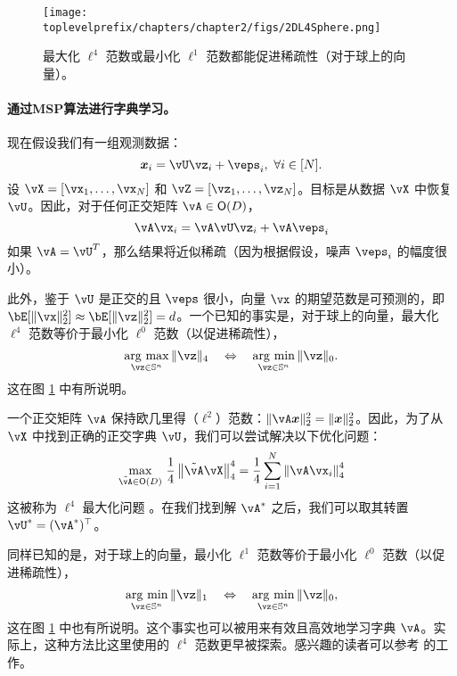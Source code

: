 \documentclass[../../book-main.tex]{subfiles}
\begin{document}
\begin{figure}
    \centering
    \texttt{[image: \\toplevelprefix/chapters/chapter2/figs/2DL4Sphere.png]}\vspace{-0.1in}
    \caption{最大化 $\ell^4$ 范数或最小化 $\ell^1$ 范数都能促进稀疏性（对于球上的向量）。}
    \label{fig:L4-sphere}
\end{figure}


\paragraph{通过MSP算法进行字典学习。}

现在假设我们有一组观测数据：
\begin{equation}
    \x_i = \vU \vz_i + \veps_i,\ \forall i \in [N].
\end{equation}
设 $\vX = [\vx_1, \dots, \vx_N]$ 和 $\vZ = [\vz_1, \dots, \vz_N]$。目标是从数据 $\vX$ 中恢复 $\vU$。因此，对于任何正交矩阵 $\vA \in \O(D)$，
\begin{equation}
    \vA\vx_i = \vA\vU \vz_i + \vA\veps_i
\end{equation}
如果 $\vA = \vU^T$，那么结果将近似稀疏（因为根据假设，噪声 $\veps_i$ 的幅度很小）。

此外，鉴于 $\vU$ 是正交的且 $\veps$ 很小，向量 $\vx$ 的期望范数是可预测的，即 $\bE[\norm{\vx}_2^2] \approx \bE[\norm{\vz}_2^2]=d$。一个已知的事实是，对于球上的向量，最大化 $\ell^4$ 范数等价于最小化 $\ell^0$ 范数（以促进稀疏性），
\begin{equation}
    \argmax_{\vz \in \mathbb{S}^n}\|\vz\|_{4}\quad\Leftrightarrow\quad \argmin_{\vz \in \mathbb{S}^n}\|\vz\|_{0}.
\end{equation}
这在图 \ref{fig:L4-sphere} 中有所说明。

一个正交矩阵 $\vA$ 保持欧几里得（\(\ell^{2}\)）范数：$\|\vA \x\|_2^2 = \|\x\|_2^2$。因此，为了从 $\vX$ 中找到正确的正交字典 $\vU$，我们可以尝试解决以下优化问题：
\begin{equation}\label{eq0:orthogonal-dictionary-learning-l4}
    \max_{\tilde{\vA} \in \O(D)}\,
     \frac{1}{4} \norm*{
    \tilde{\vA} \vX
    }_4^4 =  \frac{1}{4} \sum_{i=1}^N \norm*{
    \vA \vx_i
    }_4^4
\end{equation}
这被称为 $\ell^4$ 最大化问题 \cite{Zhai-2020}。在我们找到解 \(\vA^{\ast}\) 之后，我们可以取其转置 \(\vU^{\ast} = (\vA^{\ast})^{\top}\)。
\begin{remark}
    同样已知的是，对于球上的向量，最小化 $\ell^1$ 范数等价于最小化 $\ell^0$ 范数（以促进稀疏性），
\begin{equation*}
            \argmin_{\vz \in \mathbb{S}^n}\|\vz\|_{1}\quad\Leftrightarrow\quad \argmin_{\vz \in \mathbb{S}^n}\|\vz\|_{0},
\end{equation*}
这在图 \ref{fig:L4-sphere} 中也有所说明。这个事实也可以被用来有效且高效地学习字典 $\vA$。实际上，这种方法比这里使用的 $\ell^4$ 范数更早被探索。感兴趣的读者可以参考 \cite{qu2020findingsparsestvectorssubspace} 的工作。
\end{remark}
\end{document}
